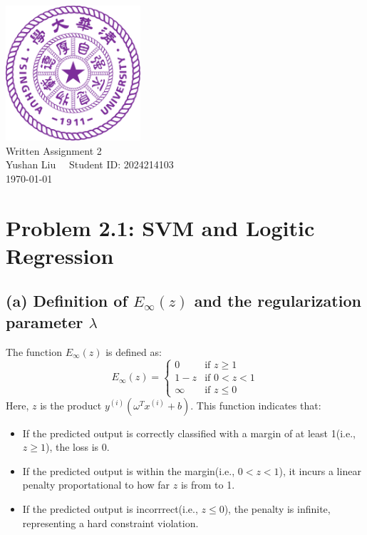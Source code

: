 \documentclass[12pt]{article}
\begin{document}
\begin{titlepage}
    \begin{center}
        \includegraphics[width=5cm]{tsinghua_logo.png}\\[4cm]  %
        {\Huge Written Assignment 2} \\[2cm]
        {\large Yushan Liu  \ \  Student ID: 2024214103}\\[6cm]
        {\normalsize \today}\\[1cm]
    \end{center}
\end{titlepage}

\section*{Problem 2.1: SVM and Logitic Regression}

\subsection*{(a) Definition of $E_{\infty}(z)$ and the regularization parameter $\lambda$}

The function $E_\infty(z)$ is defined as:
\[
E_\infty(z) = 
\begin{cases} 
0 & \text{if } z \geq 1 \\ 
1 - z & \text{if } 0 < z < 1 \\ 
\infty & \text{if } z \leq 0 
\end{cases}
\]
Here, $z$ is the product $y^{(i)}(\omega^Tx^{(i)}+b)$. This function indicates that:

\begin{itemize}
    \item If the predicted output is correctly classified with a margin of at least 1(i.e., $z \geq 1$), the loss is 0.
    \item If the predicted output is within the margin(i.e., $0 < z < 1$), it incurs a linear penalty proportational to how far $z$ is from to 1.
    \item If the predicted output is incorrrect(i.e., $z \leq 0$), the penalty is infinite, representing a hard constraint violation.
\end{itemize}
\end{document}
